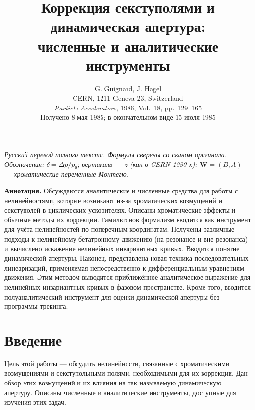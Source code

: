 \documentclass[11pt,a4paper]{article}
\title{\textbf{Коррекция секступолями и динамическая апертура:\\
численные и аналитические инструменты}}
\author{G. Guignard, J. Hagel\\[4pt]
{\small CERN, 1211 Geneva 23, Switzerland}\\[8pt]
{\small\textit{Particle Accelerators}, 1986, Vol.~18, pp.~129--165}\\
{\small Получено 8 мая 1985; в окончательном виде 15 июля 1985}}
\date{}
\begin{document}
\maketitle

\begin{center}
{\small\textit{Русский перевод полного текста. Формулы сверены со сканом оригинала.\\
Обозначения: $\delta=\Delta p/p_0$; вертикаль --- $z$ (как в CERN 1980-х);
$\mathbf{W}=(B,A)$ --- хроматические переменные Монтегю.}}
\end{center}

\vspace{0.8em}
\noindent\textbf{Аннотация.}
Обсуждаются аналитические и численные средства для работы с нелинейностями,
которые возникают из-за хроматических возмущений и секступолей в циклических
ускорителях. Описаны хроматические эффекты и обычные методы их коррекции.
Гамильтонов формализм вводится как инструмент для учёта нелинейностей по
поперечным координатам. Получены различные подходы к нелинейному бетатронному
движению (на резонансе и вне резонанса) и вычислено искажение нелинейных
инвариантных кривых. Вводится понятие динамической апертуры. Наконец,
представлена новая техника последовательных линеаризаций, применяемая
непосредственно к дифференциальным уравнениям движения. Этим методом выводится
приближённое аналитическое выражение для нелинейных инвариантных кривых в
фазовом пространстве. Кроме того, вводится полуаналитический инструмент для
оценки динамической апертуры без программы трекинга.

\tableofcontents
\newpage

\section{Введение}

Цель этой работы --- обсудить нелинейности, связанные с хроматическими
возмущениями и секступольными полями, необходимыми для их коррекции. Дан обзор
этих возмущений и их влияния на так называемую динамическую апертуру. Описаны
численные и аналитические инструменты, доступные для изучения этих задач.
\end{document}
